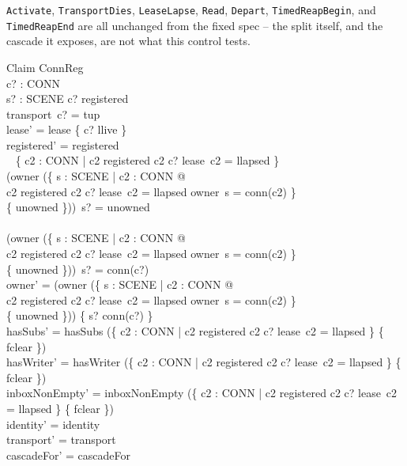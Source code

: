 \documentclass[a4paper,10pt,fleqn]{article}
\begin{document}
\texttt{Activate}, \texttt{TransportDies}, \texttt{LeaseLapse},
\texttt{Read}, \texttt{Depart}, \texttt{TimedReapBegin}, and
\texttt{TimedReapEnd} are all unchanged from the fixed spec -- the split
itself, and the cascade it exposes, are not what this control tests.

\begin{schema}{Claim}
  \Delta ConnReg \\
  c? : CONN \\
  s? : SCENE
\where
  c? \in registered \\
  transport~c? = tup \\
  lease' = lease \oplus \{ c? \mapsto llive \} \\
  registered' = registered \setminus \\
  \quad~ \{ c2 : CONN | c2 \in registered \land c2 \neq c? \land
    lease~c2 = llapsed \} \\
  (owner \oplus (\{ s : SCENE | \exists c2 : CONN @ \\
    \qquad c2 \in registered \land c2 \neq c? \land lease~c2 = llapsed
    \land owner~s = conn(c2) \} \\
    \qquad \cross \{ unowned \}))~s? = unowned \\
  \lor \\
  (owner \oplus (\{ s : SCENE | \exists c2 : CONN @ \\
    \qquad c2 \in registered \land c2 \neq c? \land lease~c2 = llapsed
    \land owner~s = conn(c2) \} \\
    \qquad \cross \{ unowned \}))~s? = conn(c?) \\
  owner' = (owner \oplus (\{ s : SCENE | \exists c2 : CONN @ \\
    \qquad c2 \in registered \land c2 \neq c? \land lease~c2 = llapsed
    \land owner~s = conn(c2) \} \\
    \qquad \cross \{ unowned \})) \oplus \{ s? \mapsto conn(c?) \} \\
  hasSubs' = hasSubs \oplus (\{ c2 : CONN | c2 \in registered \land
    c2 \neq c? \land lease~c2 = llapsed \} \cross \{ fclear \}) \\
  hasWriter' = hasWriter \oplus (\{ c2 : CONN | c2 \in registered \land
    c2 \neq c? \land lease~c2 = llapsed \} \cross \{ fclear \}) \\
  inboxNonEmpty' = inboxNonEmpty \oplus (\{ c2 : CONN | c2 \in registered
    \land c2 \neq c? \land lease~c2 = llapsed \} \cross \{ fclear \}) \\
  identity' = identity \\
  transport' = transport \\
  cascadeFor' = cascadeFor
\end{schema}
\end{document}
